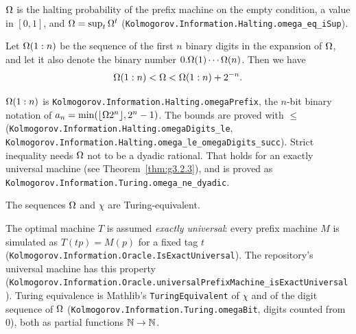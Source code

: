 \begin{formalization}
\( \Omega \) is the halting probability of the prefix machine on the empty condition, a value in
\( [0, 1] \), and \( \Omega = \sup_{t} \Omega^{t} \)
(\texttt{Kolmogorov.Information.Halting.omega\_eq\_iSup}).
\end{formalization}

Let \( \Omega(1:n) \) be the sequence of the first \( n \) binary digits in the
expansion of \( \Omega \), and let it also denote the binary number
\( 0.\Omega(1)\dotsb\Omega(n) \).
Then we have
 \[
    \Omega(1:n) < \Omega < \Omega(1:n) + 2^{-n}.
 \]

\begin{formalization}
\( \Omega(1:n) \) is \texttt{Kolmogorov.Information.Halting.omegaPrefix}, the \( n \)-bit
binary notation of \( a_{n} = \min(\lfloor \Omega 2^{n} \rfloor, 2^{n} - 1) \). The bounds are
proved with \( \le \) (\texttt{Kolmogorov.Information.Halting.omegaDigits\_le},
\texttt{Kolmogorov.Information.Halting.omega\_le\_omegaDigits\_succ}). Strict inequality
needs \( \Omega \) not to be a dyadic rational. That holds for an exactly universal machine
(see Theorem~\ref{thm:g3.2.3}), and is proved as
\texttt{Kolmogorov.Information.Turing.omega\_ne\_dyadic}.
\end{formalization}

 \begin{theorem}
  \label{thm:g3.2.3}
  \leanok
The sequences \( \Omega \) and \( \chi \) are Turing-equivalent.
 \end{theorem}

\begin{formalization}
The optimal machine \( T \) is assumed \emph{exactly universal}: every prefix machine
\( M \) is simulated as \( T(tp) = M(p) \) for a fixed tag \( t \)
(\texttt{Kolmogorov.Information.Oracle.IsExactUniversal}). The repository's universal
machine has this property
(\texttt{Kolmogorov.Information.Oracle.universalPrefixMachine\_isExactUniversal}). Turing
equivalence is Mathlib's \texttt{TuringEquivalent} of \( \chi \) and of the digit sequence of
\( \Omega \) (\texttt{Kolmogorov.Information.Turing.omegaBit}, digits counted from \( 0 \)),
both as partial functions \( \mathbb{N} \to \mathbb{N} \).
\end{formalization}

